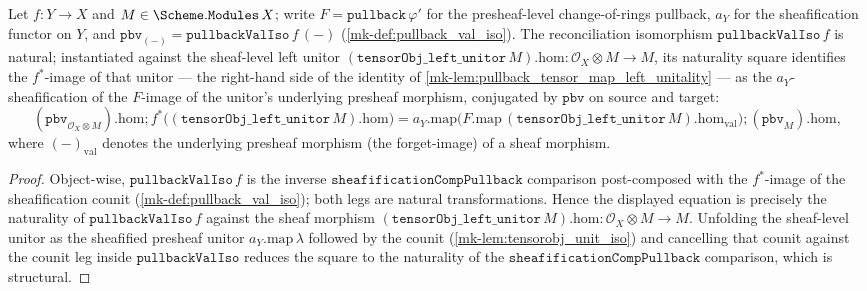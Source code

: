 \begin{lemma}\label{mk-lem:pullback_val_iso_naturality_left_unitor}
  \leanok

  Let \(f : Y \to X\) and \(M \in \Scheme.\mathtt{Modules}\,X\); write
  \(F = \mathtt{pullback}\,\varphi'\) for the presheaf-level change-of-rings pullback, \(a_Y\) for the
  sheafification functor on \(Y\), and \(\mathtt{pbv}_{(-)} = \mathtt{pullbackValIso}\,f\,(-)\)
  (\ref{mk-def:pullback_val_iso}). The reconciliation isomorphism \(\mathtt{pullbackValIso}\,f\) is
  natural; instantiated against the sheaf-level left unitor
  \((\mathtt{tensorObj\_left\_unitor}\,M).\mathrm{hom} : \mathcal{O}_X \otimes M \to M\), its naturality
  square identifies the \(f^{*}\)-image of that unitor --- the right-hand side of the identity of
  \ref{mk-lem:pullback_tensor_map_left_unitality} --- as the \(a_Y\)-sheafification of the
  \(F\)-image of the unitor's underlying presheaf morphism, conjugated by \(\mathtt{pbv}\) on source
  and target:
  \[
    (\mathtt{pbv}_{\mathcal{O}_X \otimes M}).\mathrm{hom}
      \mathbin{;} f^{*}\bigl((\mathtt{tensorObj\_left\_unitor}\,M).\mathrm{hom}\bigr)
    = a_Y.\mathrm{map}\bigl(F.\mathrm{map}\,(\mathtt{tensorObj\_left\_unitor}\,M).\mathrm{hom}_{\mathrm{val}}\bigr)
      \mathbin{;} (\mathtt{pbv}_{M}).\mathrm{hom},
  \]
  where \((-)_{\mathrm{val}}\) denotes the underlying presheaf morphism (the forget-image) of a sheaf
  morphism.
\end{lemma}
\begin{proof}
  \leanok
  Object-wise, \(\mathtt{pullbackValIso}\,f\) is the inverse \(\mathtt{sheafificationCompPullback}\)
  comparison post-composed with the \(f^{*}\)-image of the sheafification counit
  (\ref{mk-def:pullback_val_iso}); both legs are natural transformations. Hence the displayed equation
  is precisely the naturality of \(\mathtt{pullbackValIso}\,f\) against the sheaf morphism
  \((\mathtt{tensorObj\_left\_unitor}\,M).\mathrm{hom} : \mathcal{O}_X \otimes M \to M\). Unfolding the
  sheaf-level unitor as the sheafified presheaf unitor \(a_Y.\mathrm{map}\,\lambda\) followed by the
  counit (\ref{mk-lem:tensorobj_unit_iso}) and cancelling that counit against the counit leg inside
  \(\mathtt{pullbackValIso}\) reduces the square to the naturality of the
  \(\mathtt{sheafificationCompPullback}\) comparison, which is structural.
\end{proof}

